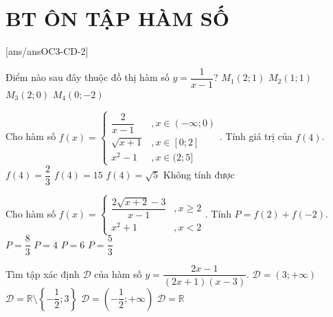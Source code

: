 \section*{BT ÔN TẬP HÀM SỐ}
\setcounter{ex}{0}\setcounter{bt}{0}
[ans/ansOC3-CD-2]

\begin{ex}%
    Điểm nào sau đây thuộc đồ thị hàm số $y=\dfrac{1}{x-1}$?
    \choice
    {\True $M_1(2;1)$}
    {$M_2(1;1)$}
    {$M_3(2;0)$}
    {$M_4(0;-2)$}
\end{ex}

\begin{ex}%
    Cho hàm số $f(x)=\left\{\begin{array}{*{35}{l}}
    \dfrac{2}{x-1} &, x\in(-\infty;0) \\
    \sqrt{x+1} &, x\in[0;2] \\
    x^2-1 &, x\in(2;5]
    \end{array}\right.$. Tính giá trị của $f(4)$.
    \choice
    {$f(4)=\dfrac{2}{3}$}
    {\True $f(4)=15$}
    {$f(4)=\sqrt{5}$}
    {Không tính được}
    \loigiai{Do $4\in(2;5]$ nên $f(4)=4^2-1=15$.}
\end{ex}

\begin{ex}%
    Cho hàm số $f(x)=\left\{\begin{array}{*{35}{l}}
    \dfrac{2\sqrt{x+2}-3}{x-1} &, x\ge 2 \\
    x^2 +1 &, x<2
    \end{array}\right.$. Tính $P=f(2)+f(-2)$.
    \choice
    {$P=\dfrac{8}{3}$}
    {$P=4$}
    {\True $P=6$}
    {$P=\dfrac{5}{3}$}
\end{ex}

\begin{ex}%
    Tìm tập xác định $\mathscr{D}$ của hàm số $y=\dfrac{2x-1}{(2x+1)(x-3)}$.
    \choice
    {$\mathscr{D}=(3;+\infty)$}
    {\True $\mathscr{D}=\mathbb{R}\setminus\left\{-\dfrac{1}{2};3\right\}$}
    {$\mathscr{D}=\left(-\dfrac{1}{2};+\infty\right)$}
    {$\mathscr{D}=\mathbb{R}$}
\end{ex}

